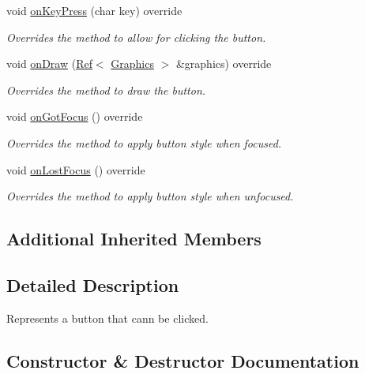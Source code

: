 \begin{DoxyCompactItemize}
void \mbox{\hyperlink{class_button_ac697a388171f59e9953eb6ae1dcf37a1}{on\+Key\+Press}} (char key) override
\begin{DoxyCompactList}\small\item\em Overrides the method to allow for clicking the button. \end{DoxyCompactList}\item 
void \mbox{\hyperlink{class_button_afdb39226fa5833cdbbd6d061783024b7}{on\+Draw}} (\mbox{\hyperlink{class_ref}{Ref}}$<$ \mbox{\hyperlink{class_graphics}{Graphics}} $>$ \&graphics) override
\begin{DoxyCompactList}\small\item\em Overrides the method to draw the button. \end{DoxyCompactList}\item 
void \mbox{\hyperlink{class_button_a3fd6af2ee1bdd52a0b61177f80ff7d2c}{on\+Got\+Focus}} () override
\begin{DoxyCompactList}\small\item\em Overrides the method to apply button style when focused. \end{DoxyCompactList}\item 
void \mbox{\hyperlink{class_button_ac80b96f804bcb1a8cdf1b8617be02c55}{on\+Lost\+Focus}} () override
\begin{DoxyCompactList}\small\item\em Overrides the method to apply button style when unfocused. \end{DoxyCompactList}\end{DoxyCompactItemize}
\subsection*{Additional Inherited Members}


\subsection{Detailed Description}
Represents a button that cann be clicked. 



\subsection{Constructor \& Destructor Documentation}
\mbox{\label{class_button_a3b36df1ae23c58aedb9e15a713159459}} 
